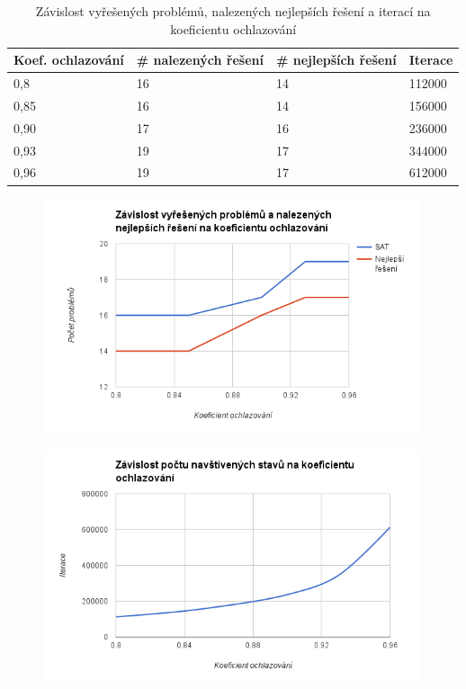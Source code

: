 \documentclass[10pt,a4paper]{article}
\begin{document}
\begin{table}[H]
\centering
  \begin{tabular}{ |l|l|l|l|}
  \hline
  Koef. ochlazování & \# nalezených řešení & \# nejlepších řešení & Iterace\\
  \hline
    0,8  & 16 & 14 & 112000 \\
    0,85 & 16 & 14 & 156000 \\
    0,90 & 17 & 16 & 236000 \\
    0,93 & 19 & 17 & 344000 \\
    0,96 & 19 & 17 & 612000 \\
  \hline
  \end{tabular}
  \caption{Závislost vyřešených problémů, nalezených nejlepších řešení a iterací na koeficientu ochlazování}
\end{table}


\begin{figure}[H]\centering
 \includegraphics[width=0.99\textwidth]{4}
\end{figure}

\begin{figure}[H]\centering
 \includegraphics[width=0.99\textwidth]{5}
\end{figure}
\end{document}
